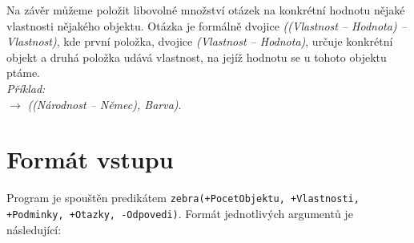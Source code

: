 \documentclass[11pt]{article} %
\begin{document}
\noindent Na závěr můžeme položit libovolné množství otázek na konkrétní hodnotu nějaké vlastnosti nějakého objektu. Otázka je formálně dvojice \emph{((Vlastnost -- Hodnota) -- Vlastnost)}, kde první položka, dvojice \emph{(Vlastnost -- Hodnota)}, určuje konkrétní objekt a druhá položka udává vlastnost, na jejíž hodnotu se u tohoto objektu ptáme. \\
\emph{Příklad:} \\
 $\rightarrow$ \emph{((Národnost -- Němec), Barva)}.

\section{Formát vstupu}
Program je spouštěn predikátem \texttt{zebra(+PocetObjektu, +Vlastnosti, +Podminky, +Otazky, -Odpovedi)}. Formát jednotlivých argumentů je následující:
\end{document}
